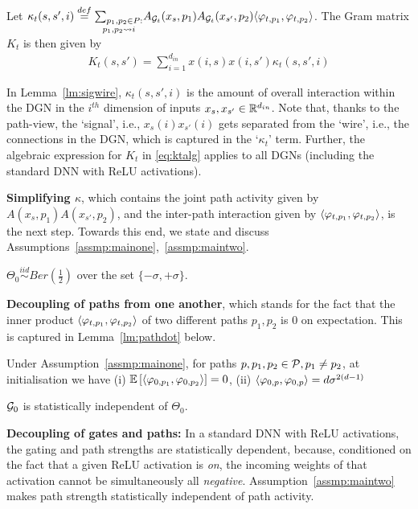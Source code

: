 \begin{lemma}\label{lm:sigwire}
Let $\kappa_t(s,s',i)\stackrel{def}=\underset{p_1,p_2\rsa i}{\sum_{p_1,p_2\in P:}} A_{\G_t}(x_s,p_1) A_{\G_t}(x_{s'},p_2) \ip{\varphi_{t,p_1}, \varphi_{t,p_2}}$. The Gram matrix $K_t$ is then given by 
\begin{align}\label{eq:ktalg}
{K_t(s,s')}=\sum_{i=1}^{d_{in}} x(i,s)x(i,s') \kappa_t(s,s',i)
\end{align}
\end{lemma}
In Lemma~\ref{lm:sigwire}, $\kappa_t(s,s',i)$ is the amount of overall interaction within the DGN in the $i^{th}$ dimension of inputs $x_s,x_{s'}\in \R^{d_{in}}$. Note that, thanks to the path-view, the `signal', i.e., $x_s(i)x_{s'}(i)$ gets separated from the `wire', i.e., the connections in the DGN, which is captured in the `$\kappa_t$' term. Further, the algebraic expression for $K_t$ in \eqref{eq:ktalg} applies to all DGNs (including the standard DNN with ReLU activations).

\textbf{Simplifying $\kappa$}, which contains the joint path activity given by $A(x_s,p_1)A(x_{s'},p_2)$, and the inter-path interaction given by $\ip{\varphi_{t,p_1}, \varphi_{t,p_2}}$, is the next step. Towards this end, we state and discuss Assumptions~\ref{assmp:mainone},~\ref{assmp:maintwo}.
\begin{assumption}\label{assmp:mainone}
$\Theta_0\stackrel{iid}\sim Ber\left(\frac{1}{2}\right)$ over the set $\{-\sigma,+\sigma\}$. 
\end{assumption}
\textbf{Decoupling of paths from one another}, which stands for the fact that the inner product $\ip{\varphi_{t,p_1}, \varphi_{t,p_2}}$ of two different paths $p_1,p_2$ is $0$ on expectation. This is captured in Lemma~\ref{lm:pathdot} below.
\begin{lemma}\label{lm:pathdot}
Under Assumption~\ref{assmp:mainone}, for paths $p,p_1,p_2\in \P, p_1\neq p_2$, at initialisation we have (i) $\E{\ip{\varphi_{0,p_1}, \varphi_{0,p_2}}}= 0$, (ii) ${\ip{\varphi_{0,p}, \varphi_{0,p}}}= d\sigma^{2(d-1)}$
\end{lemma}

\begin{assumption}\label{assmp:maintwo}
$\G_0$ is statistically independent of $\Theta_0$.
\end{assumption}
\textbf{Decoupling of gates and paths:} In a standard DNN with ReLU activations, the gating and path strengths are statistically dependent, because, conditioned on the fact that a given ReLU activation is \emph{on}, the incoming weights of that activation cannot be simultaneously all \emph{negative}. Assumption~\ref{assmp:maintwo} makes path strength statistically independent of path activity.

